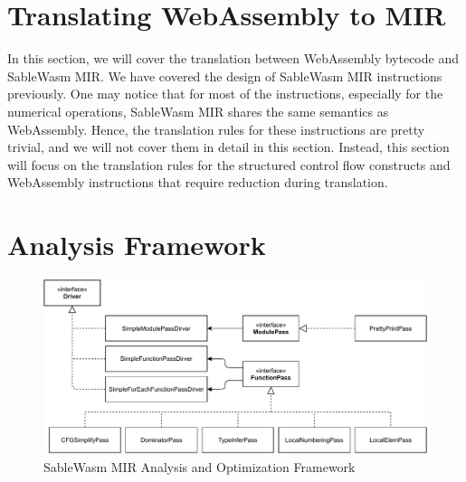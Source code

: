 \section{Translating WebAssembly to MIR}

In this section, we will cover the translation between WebAssembly bytecode and
SableWasm MIR. We have covered the design of SableWasm MIR instructions
previously. One may notice that for most of the instructions, especially for the
numerical operations, SableWasm MIR shares the same semantics as WebAssembly.
Hence, the translation rules for these instructions are pretty trivial, and we
will not cover them in detail in this section. Instead, this section will focus
on the translation rules for the structured control flow constructs and
WebAssembly instructions that require reduction during translation.




\section{Analysis Framework}

\begin{figure}
    \centering
    \includegraphics[width=\textwidth]{Images/4.MIR/analysis-framework.pdf}
    \caption{SableWasm MIR Analysis and Optimization Framework}
    \label{fig:sablewasm-mir-analysis-framework}
\end{figure}

